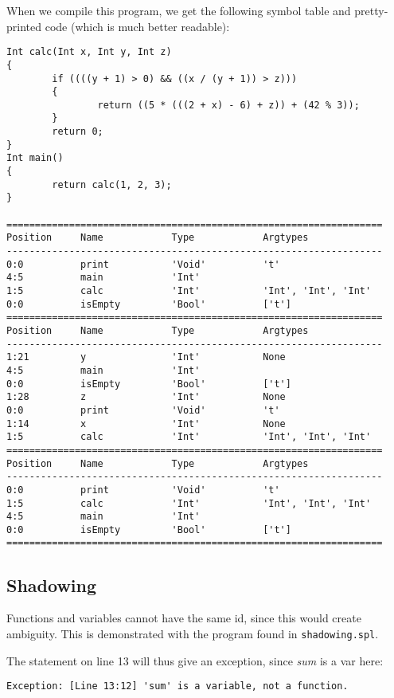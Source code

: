 \documentclass[a4paper]{article}
\begin{document}
When we compile this program, we get the following symbol table and pretty-printed code (which is much better readable):
\begin{verbatim}
Int calc(Int x, Int y, Int z)
{
        if ((((y + 1) > 0) && ((x / (y + 1)) > z)))
        {
                return ((5 * (((2 + x) - 6) + z)) + (42 % 3));
        }
        return 0;
}
Int main()
{
        return calc(1, 2, 3);
}

==================================================================
Position     Name            Type            Argtypes            
------------------------------------------------------------------
0:0          print           'Void'          't'                 
4:5          main            'Int'                               
1:5          calc            'Int'           'Int', 'Int', 'Int' 
0:0          isEmpty         'Bool'          ['t']               
==================================================================
Position     Name            Type            Argtypes            
------------------------------------------------------------------
1:21         y               'Int'           None                
4:5          main            'Int'                               
0:0          isEmpty         'Bool'          ['t']               
1:28         z               'Int'           None                
0:0          print           'Void'          't'                 
1:14         x               'Int'           None                
1:5          calc            'Int'           'Int', 'Int', 'Int' 
==================================================================
Position     Name            Type            Argtypes            
------------------------------------------------------------------
0:0          print           'Void'          't'                 
1:5          calc            'Int'           'Int', 'Int', 'Int' 
4:5          main            'Int'                               
0:0          isEmpty         'Bool'          ['t']               
==================================================================
\end{verbatim}

\subsection{Shadowing}
Functions and variables cannot have the same id, since this would create ambiguity. This is demonstrated with the program found in {\tt shadowing.spl}.

The statement on line 13 will thus give an exception, since \emph{sum} is a var here: 
\begin{verbatim}
Exception: [Line 13:12] 'sum' is a variable, not a function.
\end{verbatim}
\end{document}
